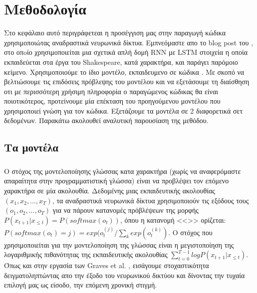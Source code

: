 \chapter{Μεθοδολογία}
Στο κεφάλαιο αυτό περιγράφετεαι η προσέγγιση μας στην παραγωγή κώδικα χρησιμοποιώτας αναδραστικά νευρωνικά δίκτυα.
Εμπνεόμαστε απο το blog post του , στο οπoίο χρησιμοποιείται μια σχετικά απλή δομή RNN με LSTM στοιχεία η οποία εκπαιδεύεται στα έργα του Shakespeare, κατά χαρακτήρα, και παράγει παρόμοιο κείμενο.
Χρησιμοποιούμε το ίδιο μοντέλο, εκπαιδευμενο σε κώδικα .
Με σκοπό να βελτιώσουμε τις επιδόσεις πρόβλεψης του μοντέλου και να εξετάσουμε τη διαίσθηση οτι με περισσότερη χρήσιμη πληροφορία ο παραγώμενος κώδικας θα είναι ποιοτικότερος, προτείνουμε μία επέκταση του προηγούμενου μοντέλου που χρησιμοποιεί  γνώση για τον κώδικα.
Εξετάζουμε τα μοντέλα σε 2 διαφορετικά σετ δεδομένων.
Παρακάτω ακολουθεί αναλυτική παρουσίαση της μεθόδου.

\section{Τα μοντέλα}

\subsection{}
Ο στόχος της μοντελοποίησης γλώσσας κατα χαρακτήρα (χωρίς να αναφερόμαστε απαραίτητα στην προγραμματιστική γλώσσα) είναι να προβλέψει τον επόμενο χαρακτήρα σε μία ακολουθία.
Δεδομένης μιας εκπαιδευτικής ακολουθίας $(x_1, x_2, ..., x_T)$, τα αναδραστικά νευρωνικά δίκτυα
χρησιμοποιούν τις εξόδους τους $(ο_1, ο_2, ..., ο_T)$ για να πάρουν κατανομές πρόβλέψεων της μορφής $P(x_{t+1}|x_{\leq{t}}) = P(softmax(o_t))$, όπου η κατανομή <<>> ορίζεται: $P(softmax(o_t) = j) = exp(o_t^{(j)}/\sum_k exp(o_t^{(k)})$.
Ο στόχος που χρησιμοποιείται για την μοντελοποίηση της γλώσσας είναι η μεγιστοποίηση της λογαριθμικής πιθανότητας της εκπαιδευτικής ακολουθίας $\sum_{t=0}^{T-1}logP(x_{t+1}|x_{\leq{t}})$.
Όπως και στην εργασία των Graves et al. \cite{Graves2013}, εισάγουμε στοχαστικότητα δειγματοληπτώντας απο την έξοδο του νευρωνικού δικτύου και δίνοντας την τυχαία επιλογή μας ως είσοδο, την επόμενη χρονική στιγμή.

\subsection{}

